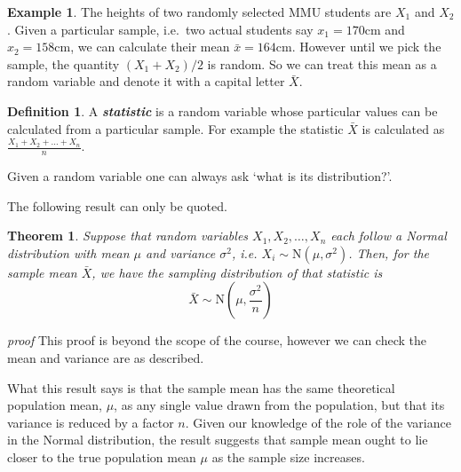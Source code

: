 \documentclass[
]{book}
\newtheorem{theorem}{Theorem}[chapter]
\theoremstyle{definition}
\newtheorem{definition}{Definition}[chapter]
\theoremstyle{definition}
\newtheorem{example}{Example}[chapter]
\theoremstyle{definition}
\theoremstyle{definition}
\theoremstyle{remark}
\begin{document}
\begin{example}
The heights of two randomly selected MMU students are \(X_1\) and \(X_2\). Given a particular sample, i.e.~two actual students say \(x_1=170\)cm and \(x_2=158\)cm, we can calculate their mean \(\bar{x}=164\)cm. However until we pick the sample, the quantity \((X_1+X_2)/2\) is random. So we can treat this mean as a random variable and denote it with a capital letter \(\bar{X}\).
\end{example}

\begin{definition}
A \textbf{\emph{statistic}} is a random variable whose particular values can be calculated from a particular sample. For example the statistic \(\bar{X}\) is calculated as \(\frac{X_1+X_2+\ldots+X_n}{n}\).
\end{definition}

Given a random variable one can always ask `what is its distribution?'.

The following result can only be quoted.

\begin{theorem}
Suppose that random variables \(X_1,X_2,\ldots,X_n\) each follow a
Normal distribution with mean \(\mu\) and variance \(\sigma^2\), i.e.
\(X_i\sim \text{N}({\mu},{\sigma^2})\). Then, for the sample mean \(\bar{X}\), we
have the \emph{sampling distribution} of that statistic is
\[\bar{X}\sim \text{N}(\mu,\frac{\sigma^2}{n})\]
\end{theorem}

\emph{proof}
This proof is beyond the scope of the course, however we can check the mean and variance are as described.

What this result says is that the sample mean has the same theoretical population mean, \(\mu\), as any single value drawn from the population, but that its variance is reduced by a factor \(n\). Given our knowledge of the role of the variance in the Normal distribution, the result suggests that sample mean ought to lie closer to the true population mean \(\mu\) as the sample size increases.
\end{document}

